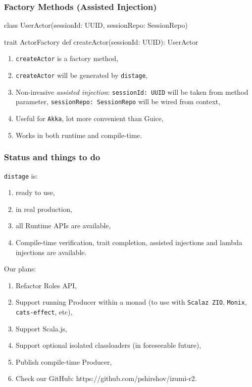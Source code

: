 \documentclass[usenames,dvipsnames]{beamer}
\newcommand{\distage}{\texttt{distage}\xspace}
\begin{document}
\begin{frame}[fragile]
\frametitle{Factory Methods (Assisted Injection)}
\begin{scalacode}
class UserActor(sessionId: UUID, sessionRepo: SessionRepo)

trait ActorFactory {
  def createActor(sessionId: UUID): UserActor
}
\end{scalacode}

\begin{enumerate}
\item \texttt{createActor} is a factory method,
\item \texttt{createActor} will be generated by \distage ,
\item Non-invasive \textit{assisted injection}: \texttt{sessionId: UUID} will be taken from method parameter, \texttt{sessionRepo: SessionRepo} will be wired from context,
\item Useful for \texttt{Akka}, lot more convenient than Guice,
\item Works in both runtime and compile-time.
\end{enumerate}
\end{frame}

\begin{frame}
\frametitle{Status and things to do}
\distage is:
\begin{enumerate}
\item ready to use,
\item in real production,
\item all Runtime APIs are available,
\item Compile-time verification, trait completion, assisted injections and lambda injections are available.
\end{enumerate}
\vspace{0.3cm}
Our plans:
\begin{enumerate}
\item Refactor Roles API,
\item Support running Producer within a monad (to use with \texttt{Scalaz ZIO}, \texttt{Monix}, \texttt{cats-effect}, etc),
\item Support Scala.js,
\item Support optional isolated classloaders (in foreseeable future),
\item Publish compile-time Producer,
\item Check our GitHub: https://github.com/pshirshov/izumi-r2.
\end{enumerate}
\end{frame}
\end{document}
